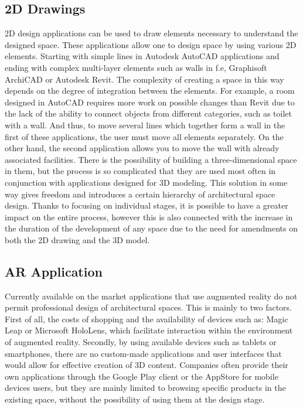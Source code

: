 \documentclass[runningheads]{llncs}
\begin{document}
\subsection{2D Drawings}
2D design applications can be used to draw elements necessary to understand the designed space. These applications allow one to design space by using various 2D elements. Starting with simple lines in Autodesk AutoCAD applications and ending with complex multi-layer elements such as walls in f.e, Graphisoft ArchiCAD or Autodesk Revit. The complexity of creating a space in this way depends on the degree of integration between the elements. For example, a room designed in AutoCAD requires more work on possible changes than Revit due to the lack of the ability to connect objects from different categories, such as toilet with a wall. And thus, to move several lines which together form a wall in the first of these applications, the user must move all elements separately. On the other hand, the second application allows you to move the wall with already associated facilities. There is the possibility of building a three-dimensional space in them, but the process is so complicated that they are used most often in conjunction with applications designed for 3D modeling. This solution in some way gives freedom and introduces a certain hierarchy of architectural space design. Thanks to focusing on individual stages, it is possible to have a greater impact on the entire process, however this is also connected with the increase in the duration of the development of any space due to the need for amendments on both the 2D drawing and the 3D model.

\subsection{AR Application}
Currently available on the market applications that use augmented reality do not permit professional design of architectural spaces. This is mainly to two factors. First of all, the costs of shopping and the availability of devices such as: Magic Leap or Microsoft HoloLens, which facilitate interaction within the environment of augmented reality. Secondly, by using available devices such as tablets or smartphones, there are no custom-made applications and user interfaces that would allow for effective creation of 3D content. Companies often provide their own applications through the Google Play client or the AppStore for mobile devices users, but they are mainly limited to browsing specific products in the existing space, without the possibility of using them at the design stage.
\end{document}
